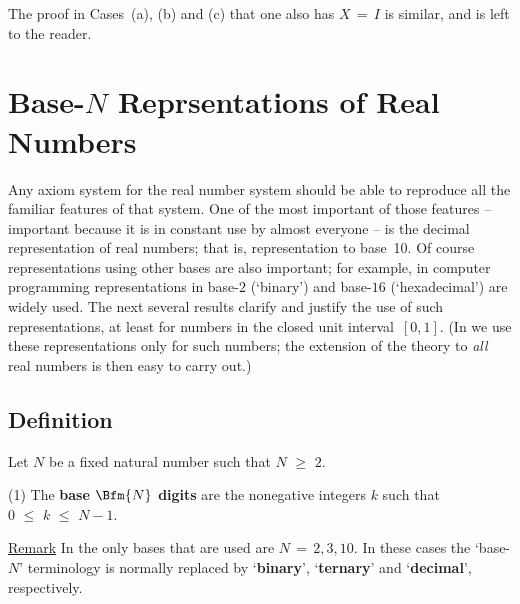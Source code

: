         The proof in Cases~(a), (b) and (c) that one also has $X \,=\, I$ is similar, and is left to the reader.



            \section{\bf Base-$N$ Reprsentations of Real Numbers}
            \label{SectB40}

\V

        Any axiom system for the real number system should be able to reproduce all the familiar features of that system.
    One of the most important of those features -- important because it is in constant use by almost everyone --
    is the decimal representation of real numbers; that is, representation to base~10.
    Of course representations using other bases are also important; for example, in computer programming
    representations in base-$2$ (`binary') and base-$16$ (`hexadecimal') are widely used.
    The next several results clarify and justify the use of such representations, at least for numbers in the closed unit interval~$[0,1]$.
    (In {\ThisText} we use these representations only for such numbers; the extension of the theory to {\em all} real numbers is then easy to carry out.)

\V

            \subsection{\small{\bf Definition}}
            \label{DefB30.65A}

\V

        Let $N$ be a fixed natural number such that $N\,\,{\geq}\,\,2$.

\V


        (1) The {\bf base $\Bfm{N}$ digits} are the nonegative integers $k$ such that $0\,\,{\leq}\,\,k\,\,{\leq}\,\,N-1$.

        \underline{Remark} In {\ThisText} the only bases that are used are $N \,=\, 2, 3, 10$.
    In these cases the `base-$N$' terminology is normally replaced by `{\bf binary}', `{\bf ternary}' and `{\bf decimal}', respectively.

